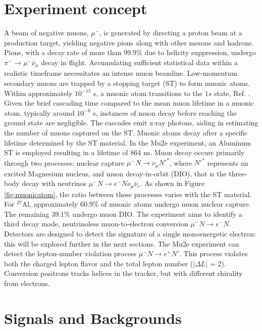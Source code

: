 \section{Experiment concept}
A beam of negative muons, $\mu ^-$, is generated by directing a proton beam at a production target, yielding negative pions along with other mesons and hadrons. 
Pions, with a decay rate of more than 99.9\% due to helicity suppression, undergo $\pi ^- \rightarrow \mu ^- \bar{\nu}_\mu$ decay in flight. 
Accumulating sufficient statistical data within a realistic timeframe necessitates an intense muon beamline. 
Low-momentum secondary muons are trapped by a stopping target (ST) to form muonic atoms. Within approximately $10^{-13}$ s, 
a muonic atom transitions to the $1s$ state, Ref. \cite{MEASDAY2001243}. 
Given the brief cascading time compared to the mean muon lifetime in a muonic atom, typically around $10^{-6}$ s, 
instances of muon decay before reaching the ground state are negligible. 
The cascades emit x-ray photons, aiding in estimating the number of muons captured on the ST. 
Muonic atoms decay after a specific lifetime determined by the ST material. 
In the Mu2e experiment, an Aluminum ST is employed resulting in a lifetime of 
864 ns. Muon decay occurs primarily through two processes: 
nuclear capture $\mu^- N \rightarrow \nu_\mu N'^* $, where $N'^*$ represents an excited 
Magnesium nucleus, and muon decay-in-orbit (DIO), 
that is the three-body decay with neutrinos $\mu ^- N \rightarrow e^- N \nu_\mu \bar{\nu}_e$. 
As shown in Figure \ref{fig:muonicatom}, the ratio between these 
processes varies with the ST material. For $^{27}$Al, approximately 60.9\% 
of muonic atoms undergo muon nuclear capture. The remaining 39.1\% undergo muon DIO. 
The experiment aims to identify a third decay mode, neutrinoless muon-to-electron 
conversion $\mu^- N \rightarrow e^- N $. Detectors are designed to detect the signature of a 
single monoenergetic electron: this will be explored further in the next sections.
The Mu2e experiment can detect the lepton-number violation process $\mu^- N \rightarrow e^+ N'$.
This process violates both the charged lepton flavor and the total lepton number ($|\Delta L|$ = 2). 
Conversion positrons tracks helices in the tracker, but with different chirality from electrons. 
\section{Signals and Backgrounds}\label{sigandbkg}

